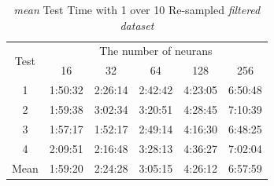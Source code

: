 \documentclass[draft,dvipsnames]{drexel-thesis}
\begin{document}
\begin{thesis}
\begin{table}[!t]
\centering
\caption{{\em mean} Test Time with 1 over 10 Re-sampled {\em filtered dataset}}
\label{tbl:mean_1_10_time}
\begin{tabular}{|c|c|c|c|c|c|}
\hline
\multirow{2}{*}{Test}      & \multicolumn{5}{c|}{The number of neurans}                                                                                                               \\ \cline{2-6}
                           & 16                           & 32                           & 64                           & 128                          & 256                          \\ \hline
1                          & 1:50:32                      & 2:26:14                      & 2:42:42                      & 4:23:05                      & 6:50:48                      \\ \hline
2                          & 1:59:38                      & 3:02:34                      & 3:20:51                      & 4:28:45                      & 7:10:39                      \\ \hline
3                          & 1:57:17                      & 1:52:17                      & 2:49:14                      & 4:16:30                      & 6:48:25                      \\ \hline
4                          & 2:09:51                      & 2:16:48                      & 3:28:13                      & 4:36:27                      & 7:02:04                      \\ \hline
\multicolumn{1}{|l|}{Mean} & \multicolumn{1}{l|}{1:59:20} & \multicolumn{1}{l|}{2:24:28} & \multicolumn{1}{l|}{3:05:15} & \multicolumn{1}{l|}{4:26:12} & \multicolumn{1}{l|}{6:57:59} \\ \hline
\end{tabular}
\end{table}


\end{thesis}
\end{document}
